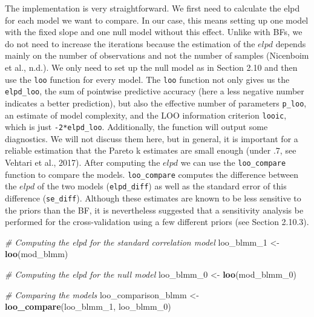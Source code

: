 \documentclass[
  doc,12pt,floatsintext]{apa7}
\newenvironment{Shaded}{\begin{snugshade}}{\end{snugshade}}
\newcommand{\CommentTok}[1]{\textcolor[rgb]{0.56,0.35,0.01}{\textit{#1}}}
\newcommand{\FunctionTok}[1]{\textcolor[rgb]{0.13,0.29,0.53}{\textbf{#1}}}
\newcommand{\NormalTok}[1]{#1}
\newcommand{\OtherTok}[1]{\textcolor[rgb]{0.56,0.35,0.01}{#1}}
\begin{document}
The implementation is very straightforward. We first need to calculate the elpd for each model we want to compare. In our case, this means setting up one model with the fixed slope and one null model without this effect. Unlike with BFs, we do not need to increase the iterations because the estimation of the \(elpd\) depends mainly on the number of observations and not the number of samples (Nicenboim et al., n.d.). We only need to set up the null model as in Section 2.10 and then use the \texttt{loo} function for every model. The \texttt{loo} function not only gives us the \texttt{elpd\_loo}, the sum of pointwise predictive accuracy (here a less negative number indicates a better prediction), but also the effective number of parameters \texttt{p\_loo}, an estimate of model complexity, and the LOO information criterion \texttt{looic}, which is just \texttt{-2*elpd\_loo}. Additionally, the function will output some diagnostics. We will not discuss them here, but in general, it is important for a reliable estimation that the Pareto k estimates are small enough (under .7, see Vehtari et al., 2017). After computing the \(elpd\) we can use the \texttt{loo\_compare} function to compare the models. \texttt{loo\_compare} computes the difference between the \(elpd\) of the two models (\texttt{elpd\_diff}) as well as the standard error of this difference (\texttt{se\_diff}). Although these estimates are known to be less sensitive to the priors than the BF, it is nevertheless suggested that a sensitivity analysis be performed for the cross-validation using a few different priors (see Section 2.10.3).

\begin{Shaded}
\begin{Highlighting}[]
\CommentTok{\# Computing the elpd for the standard correlation model}
\NormalTok{loo\_blmm\_1 }\OtherTok{\textless{}{-}} \FunctionTok{loo}\NormalTok{(mod\_blmm)}

\CommentTok{\# Computing the elpd for the null model}
\NormalTok{loo\_blmm\_0 }\OtherTok{\textless{}{-}} \FunctionTok{loo}\NormalTok{(mod\_blmm\_0)}

\CommentTok{\# Comparing the models}
\NormalTok{loo\_comparison\_blmm }\OtherTok{\textless{}{-}} \FunctionTok{loo\_compare}\NormalTok{(loo\_blmm\_1, loo\_blmm\_0)}
\end{Highlighting}
\end{Shaded}
\end{document}
